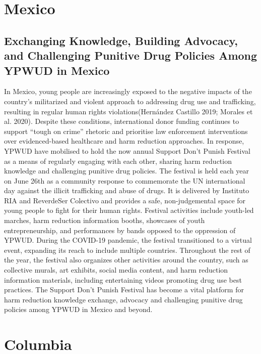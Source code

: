\documentclass[
  letterpaper,
  DIV=11,
  numbers=noendperiod]{scrartcl}
\begin{document}
\section{Mexico}

\subsection{Exchanging Knowledge, Building Advocacy, and Challenging
Punitive Drug Policies Among YPWUD in
Mexico}\label{exchanging-knowledge-building-advocacy-and-challenging-punitive-drug-policies-among-ypwud-in-mexico}

In Mexico, young people are increasingly exposed to the negative impacts
of the country's militarized and violent approach to addressing drug use
and trafficking, resulting in regular human rights violations(Hernández
Castillo 2019; Morales et al. 2020). Despite these conditions,
international donor funding continues to support ``tough on crime''
rhetoric and prioritise law enforcement interventions over
evidenced-based healthcare and harm reduction approaches. In response,
YPWUD have mobilised to hold the now annual Support Don't Punish
Festival as a means of regularly engaging with each other, sharing harm
reduction knowledge and challenging punitive drug policies. The festival
is held each year on June 26th as a community response to commemorate
the UN international day against the illicit trafficking and abuse of
drugs. It is delivered by Instituto RIA and ReverdeSer Colectivo and
provides a safe, non-judgemental space for young people to fight for
their human rights. Festival activities include youth-led marches, harm
reduction information booths, showcases of youth entrepreneurship, and
performances by bands opposed to the oppression of YPWUD. During the
COVID-19 pandemic, the festival transitioned to a virtual event,
expanding its reach to include multiple countries. Throughout the rest
of the year, the festival also organizes other activities around the
country, such as collective murals, art exhibits, social media content,
and harm reduction information materials, including entertaining videos
promoting drug use best practices. The Support Don't Punish Festival has
become a vital platform for harm reduction knowledge exchange, advocacy
and challenging punitive drug policies among YPWUD in Mexico and beyond.

\section{Columbia}
\end{document}
